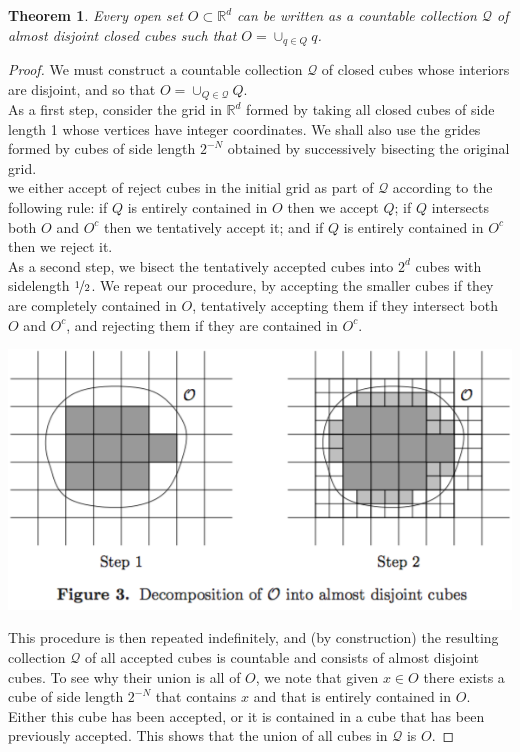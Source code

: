 \documentclass[a4paper, 11pt]{book}
\newtheorem{theorem}{Theorem}
\theoremstyle{definition}
\theoremstyle{remark}
\begin{document}
    \begin{theorem}
        Every open set $O\subset\mathbb{R}^d$ can be written as a countable collection $\mathcal{Q}$ of almost disjoint closed cubes 
        such that $O = \cup_{q\in Q} q$.
    \end{theorem}
    \begin{proof}
        We must construct a countable collection $\mathcal{Q}$ of closed cubes whose interiors are disjoint, and so that
        $O = \cup_{Q\in\mathcal{Q}} Q$.\\
        As a first step, consider the grid in $\mathbb{R}^d$ formed by taking all closed cubes of side length 1 whose vertices
        have integer coordinates. We shall also use the grides formed by cubes of side length $2^{-N}$ obtained by successively
        bisecting the original grid.\\
        we either accept of reject cubes in the initial grid as part of $\mathcal{Q}$ according to the following rule: if $Q$ is
        entirely contained in $O$ then we accept $Q$; if $Q$ intersects both $O$ and $O^c$ then we tentatively accept it; and if
        $Q$ is entirely contained in $O^c$ then we reject it.\\
        As a second step, we bisect the tentatively accepted cubes into $2^d$ cubes with sidelength $\nicefrac{1}{2}$. We repeat
        our procedure, by accepting the smaller cubes if they are completely contained in $O$, tentatively accepting them if they
        intersect both $O$ and $O^c$, and rejecting them if they are contained in $O^c$.
        \begin{center}
            \includegraphics[scale=0.5]{fig3}
        \end{center}
        This procedure is then repeated indefinitely, and (by construction) the resulting collection $\mathcal{Q}$ of all accepted
        cubes is countable and consists of almost disjoint cubes. To see why their union is all of $O$, we note that
        given $x\in O$ there exists a cube of side length $2^{-N}$ that contains $x$ and that is entirely contained in $O$. Either
        this cube has been accepted, or it is contained in a cube that has been previously accepted. This shows that the union of
        all cubes in $\mathcal{Q}$ is $O$.
    \end{proof}
\end{document}
